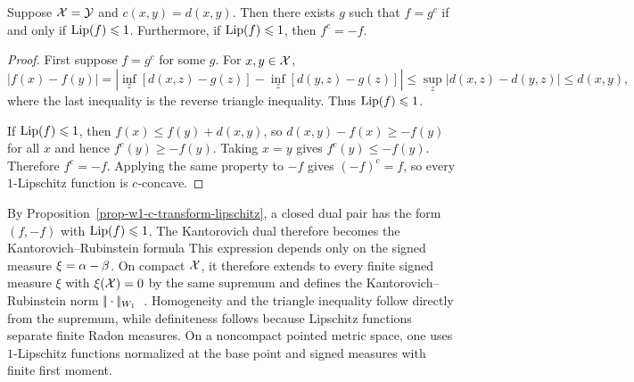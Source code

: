 \begin{prop}\label{prop-w1-c-transform-lipschitz}
	Suppose $\mathcal{X}=\mathcal{Y}$ and $c(x,y)=d(x,y)$. Then there exists $g$ such that $f=g^c$ if and only if $\operatorname{Lip}(f)\leqslant1$. Furthermore, if $\operatorname{Lip}(f)\leqslant1$, then $f^c=-f$.
\end{prop}
\begin{proof}
	First suppose $f=g^c$ for some $g$. For $x,y\in\mathcal{X}$,
	\[
		|f(x)-f(y)|
		=
		\left|\inf_z[d(x,z)-g(z)]-\inf_z[d(y,z)-g(z)]\right|
		\leq
		\sup_z |d(x,z)-d(y,z)|
		\leq d(x,y),
	\]
	where the last inequality is the reverse triangle inequality. Thus $\operatorname{Lip}(f)\leqslant1$.

	If $\operatorname{Lip}(f)\leqslant1$, then $f(x)\leq f(y)+d(x,y)$, so $d(x,y)-f(x)\geq -f(y)$ for all $x$ and hence $f^c(y)\geq -f(y)$. Taking $x=y$ gives $f^c(y)\leq -f(y)$. Therefore $f^c=-f$. Applying the same property to $-f$ gives $(-f)^c=f$, so every $1$-Lipschitz function is $c$-concave.
\end{proof}

By Proposition~\ref{prop-w1-c-transform-lipschitz}, a closed dual pair has the form $(f,-f)$ with $\operatorname{Lip}(f)\leqslant1$. The Kantorovich dual therefore becomes the Kantorovich--Rubinstein formula
This expression depends only on the signed measure $\xi=\alpha-\beta$. On compact $\mathcal{X}$, it therefore extends to every finite signed measure $\xi$ with $\xi(\mathcal{X})=0$ by the same supremum and defines the Kantorovich--Rubinstein norm $|\!| \cdot |\!|_{W_1}$~\cite{kantorovich1958space}. Homogeneity and the triangle inequality follow directly from the supremum, while definiteness follows because Lipschitz functions separate finite Radon measures. On a noncompact pointed metric space, one uses $1$-Lipschitz functions normalized at the base point and signed measures with finite first moment.

